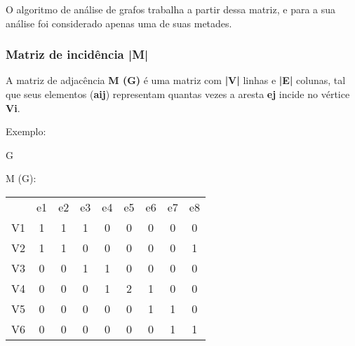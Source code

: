 \documentclass[a4paper, 12pt]{article}
\begin{document}
    \indent O algoritmo de análise de grafos trabalha a partir dessa matriz, e para a sua análise foi considerado apenas uma de suas metades.
    
\subsubsection{Matriz de incidência |M|}

    A matriz de adjacência \textbf{M (G) } é uma matriz com \textbf{|V|} linhas e \textbf{|E|} colunas, tal que seus elementos (\textbf{aij}) representam quantas vezes a aresta \textbf{ej} incide no vértice \textbf{Vi}.
    
    \vspace{0.5in}
    
    Exemplo:
    
    \begin{multicols}{2}
        \begin{center}
        G\:
        \end{center}
        
        \begin{center}
        M (G):
        \end{center}
        \begin{tabular}{ccccccccc}
            & e1 & e2 & e3 & e4 & e5 & e6 & e7 & e8 \\
            V1 & 1  & 1  & 1  & 0  & 0  & 0  & 0  & 0  \\
            V2 & 1  & 1  & 0  & 0  & 0  & 0  & 0  & 1  \\
            V3 & 0  & 0  & 1  & 1  & 0  & 0  & 0  & 0  \\
            V4 & 0  & 0  & 0  & 1  & 2  & 1  & 0  & 0  \\
            V5 & 0  & 0  & 0  & 0  & 0  & 1  & 1  & 0  \\
            V6 & 0  & 0  & 0  & 0  & 0  & 0  & 1  & 1 
        \end{tabular}
    \end{multicols}
    
\end{document}
